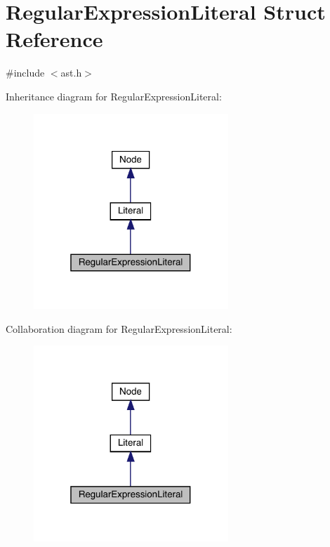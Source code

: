 \hypertarget{struct_regular_expression_literal}{}\section{Regular\+Expression\+Literal Struct Reference}
\label{struct_regular_expression_literal}


{\ttfamily \#include $<$ast.\+h$>$}



Inheritance diagram for Regular\+Expression\+Literal\+:\nopagebreak
\begin{figure}[H]
\begin{center}
\leavevmode
\includegraphics[width=208pt]{struct_regular_expression_literal__inherit__graph}
\end{center}
\end{figure}


Collaboration diagram for Regular\+Expression\+Literal\+:\nopagebreak
\begin{figure}[H]
\begin{center}
\leavevmode
\includegraphics[width=208pt]{struct_regular_expression_literal__coll__graph}
\end{center}
\end{figure}
